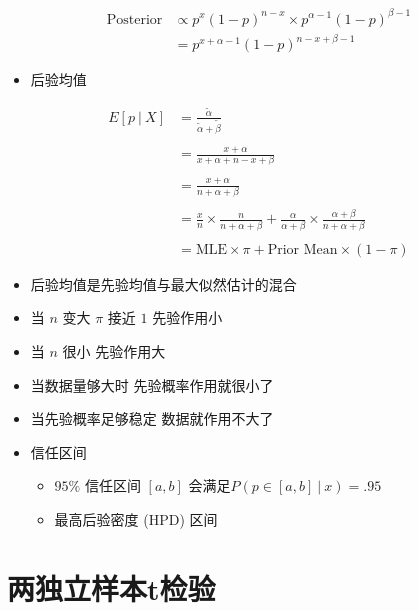 \documentclass[
]{book}
\providecommand{\tightlist}{%
  \setlength{\itemsep}{0pt}\setlength{\parskip}{0pt}}
\begin{document}
\begin{align}
\mbox{Posterior} &\propto  p^x(1 - p)^{n-x} \times p^{\alpha -1} (1 - p)^{\beta - 1} \\
                 &  =      p^{x + \alpha - 1} (1 - p)^{n - x + \beta - 1}
\end{align}

\begin{itemize}
\tightlist
\item
  后验均值
\end{itemize}

\begin{align}
E[p ~|~ X] & =   \frac{\tilde \alpha}{\tilde \alpha + \tilde \beta}\\ \\
& =  \frac{x + \alpha}{x + \alpha + n - x + \beta}\\ \\
& =  \frac{x + \alpha}{n + \alpha + \beta} \\ \\
& =  \frac{x}{n} \times \frac{n}{n + \alpha + \beta} + \frac{\alpha}{\alpha + \beta} \times \frac{\alpha + \beta}{n + \alpha + \beta} \\ \\
& =  \mbox{MLE} \times \pi + \mbox{Prior Mean} \times (1 - \pi)
\end{align}

\begin{itemize}
\tightlist
\item
  后验均值是先验均值与最大似然估计的混合
\item
  当 \(n\) 变大 \(\pi\) 接近 \(1\) 先验作用小
\item
  当 \(n\) 很小 先验作用大
\item
  当数据量够大时 先验概率作用就很小了
\item
  当先验概率足够稳定 数据就作用不大了
\item
  信任区间

  \begin{itemize}
  \tightlist
  \item
    \(95\%\) 信任区间 \([a, b]\) 会满足\(P(p \in [a, b] ~|~ x) = .95\)
  \item
    最高后验密度 (HPD) 区间
  \end{itemize}
\end{itemize}

\hypertarget{ux4e24ux72ecux7acbux6837ux672ctux68c0ux9a8c}{%
\section{两独立样本t检验}\label{ux4e24ux72ecux7acbux6837ux672ctux68c0ux9a8c}}
\end{document}

